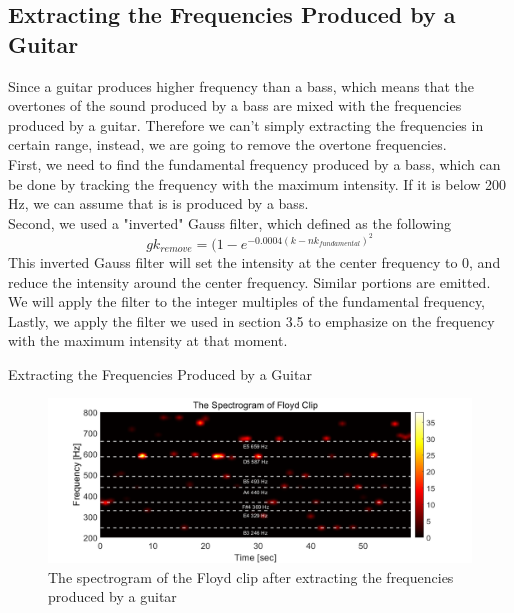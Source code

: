 \documentclass{article}
\begin{document}
\subsection{Extracting the Frequencies Produced by a Guitar}
Since a guitar produces higher frequency than a bass, which means that the overtones of the sound produced by a bass are mixed with the frequencies produced by a guitar. Therefore we can't simply extracting the frequencies in certain range, instead, we are going to remove the overtone frequencies. \\
First, we need to find the fundamental frequency produced by a bass, which can be done by tracking the frequency with the maximum intensity. If it is below 200 Hz, we can assume that is is produced by a bass. \\
Second, we used a "inverted" Gauss filter, which defined as the following
\begin{equation}
    gk_{remove} = (1 - e^{-0.0004(k-nk_{fundamental})^2}
\end{equation}
This inverted Gauss filter will set the intensity at the center frequency to 0, and reduce the intensity around the center frequency. Similar portions are emitted. We will apply the filter to the integer multiples of the fundamental frequency, \\
Lastly, we apply the filter we used in section 3.5 to emphasize on the frequency with the maximum intensity at that moment. \\

\begin{algorithm}
\begin{algorithmic}
            \ENDFOR
        \ENDIF
    \ENDFOR
\end{algorithmic}
\caption{Extracting the Frequencies Produced by a Guitar}
\end{algorithm}
\begin{figure}[h]
    \centerline{\includegraphics[width=6in]{music_score_Floyd_3.png}}
    \caption{The spectrogram of the Floyd clip after extracting the frequencies produced by a guitar}
\end{figure}
\end{document}
